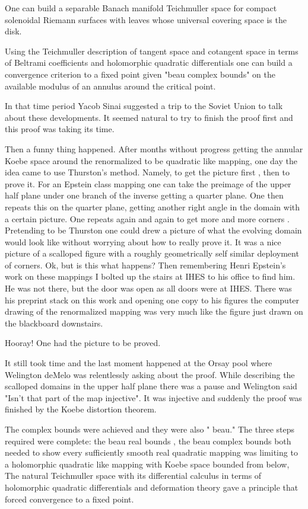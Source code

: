 \begin{description}
 One  can build a separable Banach manifold  Teichmuller space for  compact solenoidal Riemann surfaces with leaves whose universal covering space is the disk.

Using the Teichmuller description of tangent space and cotangent space in terms of Beltrami coefficients and holomorphic quadratic differentials one   can   build a convergence criterion to a fixed point  given   "beau complex bounds" on the  available modulus of an annulus  around the critical point.

 In that time period  Yacob Sinai  suggested  a trip to the  Soviet  Union to talk about these developments. It seemed natural to try to  finish the proof first and this proof was taking its time.

 Then a  funny thing  happened. After months  without progress  getting  the annular  Koebe space around the renormalized to be quadratic like mapping, one day the idea came to use Thurston's method.  Namely, to get the picture  first , then to prove it.  For an  Epstein class mapping one  can take  the preimage of the upper half plane under one branch of the inverse getting a quarter plane. One then repeats this on the quarter plane, getting another right angle in the domain with a certain picture. One repeats again and again to get  more and more  corners . Pretending to be Thurston  one could  drew a picture of what the evolving domain would look like without worrying about how to really prove it. It was a nice picture of a scalloped figure with a roughly geometrically self similar  deployment of corners. Ok, but is this what happens?
Then remembering  Henri Epstein's work  on these mappings  I  bolted up the stairs at IHES to his office to find him. He was not there, but the door was open as all doors were at IHES. There  was his preprint stack on this work  and  opening  one copy to  his  figures the computer drawing of the renormalized mapping  was very much like the figure just drawn on the blackboard downstairs.

Hooray! One had the  picture to be proved.

It  still took time  and  the last  moment  happened at the Orsay pool where Welington deMelo was relentlessly  asking   about the proof.  While describing  the scalloped  domains in the upper half plane  there was a pause and Welington said "Isn't that part of the  map injective".  It was injective and suddenly the proof was finished by the Koebe distortion theorem.

The complex bounds were achieved and they were also " beau."  The three steps required were complete: the beau real bounds , the beau complex bounds  both needed to show every sufficiently smooth  real quadratic mapping was limiting to  a holomorphic quadratic like mapping with Koebe space bounded from below, The natural Teichmuller space with its differential calculus in terms of holomorphic quadratic differentials and deformation theory gave a principle that forced convergence to a fixed point.


\end{description}
